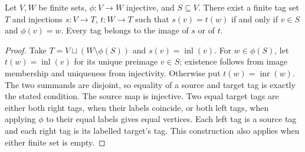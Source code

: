 \begin{lemma}
Let $V,W$ be finite sets, $\phi:V\to W$ injective, and $S\subseteq V$.
There exist a finite tag set $T$ and injections $s:V\to T$, $t:W\to T$
such that $s(v)=t(w)$ if and only if $v\in S$ and $\phi(v)=w$.
Every tag belongs to the image of $s$ or of $t$.
\end{lemma}
\begin{proof}
Take $T=V\sqcup(W\setminus\phi(S))$ and $s(v)=\operatorname{inl}(v)$.
For $w\in\phi(S)$, let $t(w)=\operatorname{inl}(v)$ for its unique
preimage $v\in S$; existence follows from image membership and uniqueness
from injectivity. Otherwise put $t(w)=\operatorname{inr}(w)$.
The two summands are disjoint, so equality of a source and target tag is
exactly the stated condition. The source map is injective. Two equal target
tags are either both right tags, when their labels coincide, or both left
tags, when applying $\phi$ to their equal labels gives equal vertices.
Each left tag is a source tag and each right tag is its labelled target's
tag. This construction also applies when either finite set is empty.
\end{proof}

